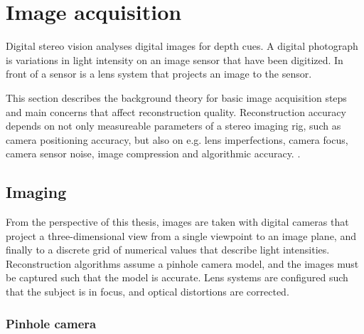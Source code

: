 


\section{Image acquisition}


Digital stereo vision analyses digital images for depth cues.
A digital photograph is variations in light intensity on an image sensor that have been digitized.
In front of a sensor is a lens system that projects an image to the sensor.

This section describes the background theory for basic image acquisition steps and main concerns that affect reconstruction quality.
Reconstruction accuracy depends on not only measureable parameters of a stereo imaging rig, such as camera positioning accuracy, but also on e.g. lens imperfections, camera focus, camera sensor noise, image compression and algorithmic accuracy. \cite{hollsten2013imagequality,kyto2011method,rieke2009evaluation}.

\subsection{Imaging} \label{sec:imaging} %

From the perspective of this thesis, images are taken with digital cameras that project a three-dimensional view from a single viewpoint to an image plane, and finally to a discrete grid of numerical values that describe light intensities.
Reconstruction algorithms assume a pinhole camera model, and the images must be captured such that the model is accurate.
Lens systems are configured such that the subject is in focus, and optical distortions are corrected.


\subsubsection{Pinhole camera} \label{sec:pinhole} %




